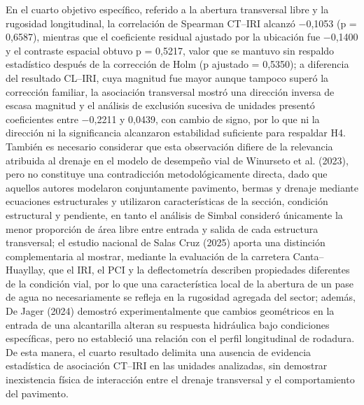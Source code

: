 En el cuarto objetivo específico, referido a la abertura transversal libre y la rugosidad longitudinal, la correlación de Spearman CT--IRI alcanzó $-$0,1053 (p = 0,6587), mientras que el coeficiente residual ajustado por la ubicación fue $-$0,1400 y el contraste espacial obtuvo p = 0,5217, valor que se mantuvo sin respaldo estadístico después de la corrección de Holm (p ajustado = 0,5350); a diferencia del resultado CL--IRI, cuya magnitud fue mayor aunque tampoco superó la corrección familiar, la asociación transversal mostró una dirección inversa de escasa magnitud y el análisis de exclusión sucesiva de unidades presentó coeficientes entre $-$0,2211 y 0,0439, con cambio de signo, por lo que ni la dirección ni la significancia alcanzaron estabilidad suficiente para respaldar H4. También es necesario considerar que esta observación difiere de la relevancia atribuida al drenaje en el modelo de desempeño vial de Winurseto et al. (2023), pero no constituye una contradicción metodológicamente directa, dado que aquellos autores modelaron conjuntamente pavimento, bermas y drenaje mediante ecuaciones estructurales y utilizaron características de la sección, condición estructural y pendiente, en tanto el análisis de Simbal consideró únicamente la menor proporción de área libre entre entrada y salida de cada estructura transversal; el estudio nacional de Salas Cruz (2025) aporta una distinción complementaria al mostrar, mediante la evaluación de la carretera Canta--Huayllay, que el IRI, el PCI y la deflectometría describen propiedades diferentes de la condición vial, por lo que una característica local de la abertura de un pase de agua no necesariamente se refleja en la rugosidad agregada del sector; además, De Jager (2024) demostró experimentalmente que cambios geométricos en la entrada de una alcantarilla alteran su respuesta hidráulica bajo condiciones específicas, pero no estableció una relación con el perfil longitudinal de rodadura. De esta manera, el cuarto resultado delimita una ausencia de evidencia estadística de asociación CT--IRI en las unidades analizadas, sin demostrar inexistencia física de interacción entre el drenaje transversal y el comportamiento del pavimento.

\endgroup
